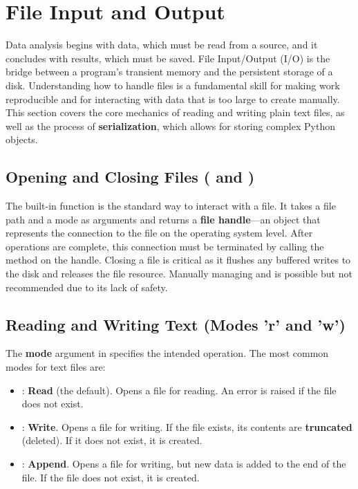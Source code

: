 \section{File Input and Output}
\label{sec:file_io}
Data analysis begins with data, which must be read from a source, and it concludes with results, which must be saved. File Input/Output (I/O) is the bridge between a program's transient memory and the persistent storage of a disk. Understanding how to handle files is a fundamental skill for making work reproducible and for interacting with data that is too large to create manually. This section covers the core mechanics of reading and writing plain text files, as well as the process of \textbf{serialization}, which allows for storing complex Python objects.

\subsection{Opening and Closing Files ( and )}
\label{subsec:open_close}
The built-in  function is the standard way to interact with a file. It takes a file path and a mode as arguments and returns a \textbf{file handle}—an object that represents the connection to the file on the operating system level. After operations are complete, this connection must be terminated by calling the  method on the handle. Closing a file is critical as it flushes any buffered writes to the disk and releases the file resource. Manually managing  and  is possible but not recommended due to its lack of safety.

\subsection{Reading and Writing Text (Modes 'r' and 'w')}
\label{subsec:read_write_modes}
The \textbf{mode} argument in  specifies the intended operation. The most common modes for text files are:
\begin{itemize}
    \item {}: \textbf{Read} (the default). Opens a file for reading. An error is raised if the file does not exist.
    \item {}: \textbf{Write}. Opens a file for writing. If the file exists, its contents are \textbf{truncated} (deleted). If it does not exist, it is created.
    \item {}: \textbf{Append}. Opens a file for writing, but new data is added to the end of the file. If the file does not exist, it is created.
\end{itemize}

